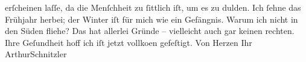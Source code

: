 \begin{ledgroupsized}[t]{13cm}
               erſcheinen laſſe, da die Menſchheit zu ſittlich iſt, um es zu dulden.\pend
           \pstart
           Ich ſehne das Frühjahr herbei; der Winter iſt für mich wie ein Gefängnis. Warum ich
               nicht in den Süden fliehe? Das hat allerlei Gründe – vielleicht auch gar keinen
               rechten. Ihre Geſundheit hoff ich iſt jetzt vollko{\geminationm}en
               gefeſtigt. Von Herzen Ihr \spacefill\mbox{ArthurSchnitzler}\pend
           
         
         \endnumbering{}\end{ledgroupsized}  \newcommand{\dateiname}{L01012}\newcommand{\titel}{Arthur Schnitzler an Georg Brandes, 11. 2. 1900}\newcommand{\editorInnen}{Martin Anton Müller und Gerd-Hermann Susen}
      